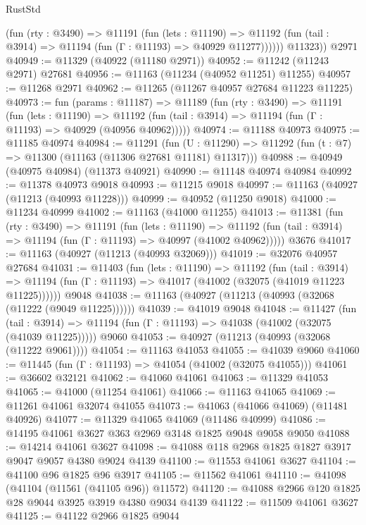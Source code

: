 \begin{lexlean}{RustStd}
\begin{coremodule}
            (fun (rty : @3490) =>
            @11191
              (fun (lets : @11190) =>
              @11192 (fun (tail : @3914) => @11194 (fun (Γ : @11193) => @40929 @11277))))))
        @11323))
    @2971
@40949 := @11329 (@40922 (@11180 @2971))
@40952 := @11242 (@11243 @2971) @27681
@40956 := @11163 (@11234 (@40952 @11251) @11255)
@40957 := @11268 @2971
@40962 := @11265 (@11267 @40957 @27684 @11223 @11225)
@40973 := fun (params : @11187) =>
  @11189
    (fun (rty : @3490) =>
    @11191
      (fun (lets : @11190) =>
      @11192 (fun (tail : @3914) => @11194 (fun (Γ : @11193) => @40929 (@40956 @40962)))))
@40974 := @11188 @40973
@40975 := @11185 @40974
@40984 := @11291
    (fun (U : @11290) => @11292 (fun (t : @7) => @11300 (@11163 (@11306 @27681 @11181) @11317)))
@40988 := @40949 (@40975 @40984) (@11373 @40921)
@40990 := @11148 @40974 @40984
@40992 := @11378 @40973 @9018
@40993 := @11215 @9018
@40997 := @11163 (@40927 (@11213 (@40993 @11228)))
@40999 := @40952 (@11250 @9018)
@41000 := @11234 @40999
@41002 := @11163 (@41000 @11255)
@41013 := @11381
    (fun (rty : @3490) =>
    @11191
      (fun (lets : @11190) =>
      @11192 (fun (tail : @3914) => @11194 (fun (Γ : @11193) => @40997 (@41002 @40962)))))
    @3676
@41017 := @11163 (@40927 (@11213 (@40993 @32069)))
@41019 := @32076 @40957 @27684
@41031 := @11403
    (fun (lets : @11190) =>
    @11192
      (fun (tail : @3914) =>
      @11194 (fun (Γ : @11193) => @41017 (@41002 (@32075 (@41019 @11223 @11225))))))
    @9048
@41038 := @11163 (@40927 (@11213 (@40993 (@32068 (@11222 (@9049 @11225))))))
@41039 := @41019 @9048
@41048 := @11427
    (fun (tail : @3914) => @11194 (fun (Γ : @11193) => @41038 (@41002 (@32075 (@41039 @11225)))))
    @9060
@41053 := @40927 (@11213 (@40993 (@32068 (@11222 @9061))))
@41054 := @11163 @41053
@41055 := @41039 @9060
@41060 := @11445 (fun (Γ : @11193) => @41054 (@41002 (@32075 @41055)))
@41061 := @36602 @32121
@41062 := @41060 @41061
@41063 := @11329 @41053
@41065 := @41000 (@11254 @41061)
@41066 := @11163 @41065
@41069 := @11261 @41061 @32074 @41055
@41073 := @41063 (@41066 @41069) (@11481 @40926)
@41077 := @11329 @41065 @41069 (@11486 @40999)
@41086 := @14195 @41061 @3627 @363 @2969 @3148 @1825 @9048 @9058 @9050
@41088 := @14214 @41061 @3627
@41098 := @41088 @118 @2968 @1825 @1827 @3917 @9047 @9057 @4380 @9024 @4139
@41100 := @11553 @41061 @3627
@41104 := @41100 @96 @1825 @96 @3917
@41105 := @11562 @41061
@41110 := @41098 (@41104 (@11561 (@41105 @96)) @11572)
@41120 := @41088 @2966 @120 @1825 @28 @9044 @3925 @3919 @4380 @9034 @4139
@41122 := @11509 @41061 @3627
@41125 := @41122 @2966 @1825 @9044

\end{coremodule}
\end{lexlean}
